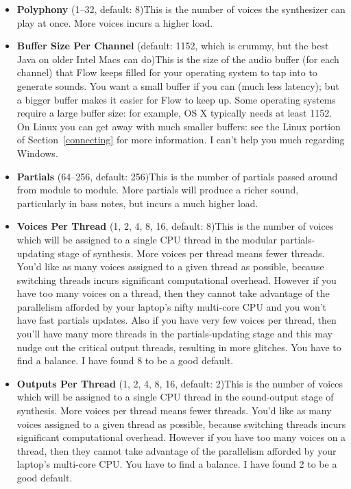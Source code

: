 \documentclass{article}
\newcommand\name{Flow}
\begin{document}
\begin{itemize}
\item {\bf Polyphony} (1--32, default: 8)\qquad This is the number of voices the synthesizer can play at once.  More voices incurs a higher load.

\item {\bf Buffer Size Per Channel} (default: 1152, which is crummy, but the best Java on older Intel Macs can do)\qquad This is the size of the audio buffer (for each channel) that {\name} keeps filled for your operating system to tap into to generate sounds.  You want a small buffer if you can (much less latency); but a bigger buffer makes it easier for Flow to keep up.  Some operating systems require a large buffer size: for example, OS X typically needs at least 1152. On Linux you can get away with much smaller buffers: see the Linux portion of Section~\ref{connecting} for more information.  I can't help you much regarding Windows.

\item {\bf Partials} (64--256, default: 256)\qquad This is the number of partials passed around from module to module.  More partials will produce a richer sound, particularly in bass notes, but incurs a much higher load.

\item {\bf Voices Per Thread} (1, 2, 4, 8, 16, default: 8)\qquad This is the number of voices which will be assigned to a single CPU thread in the modular partials-updating stage of synthesis.  More voices per thread means fewer threads.  You'd like as many voices assigned to a given thread as possible, because switching threads incurs significant computational overhead.  However if you have too many voices on a thread, then they cannot take advantage of the parallelism afforded by your laptop's nifty multi-core CPU and you won't have fast partials updates.  Also if you have very few voices per thread, then you'll have many more threads in the partials-updating stage and this may nudge out the critical output threads, resulting in more glitches.  You have to find a balance.   I have found 8 to be a good default.

\item {\bf Outputs Per Thread} (1, 2, 4, 8, 16, default: 2)\qquad This is the number of voices which will be assigned to a single CPU thread in the sound-output stage of synthesis.  More voices per thread means fewer threads.  You'd like as many voices assigned to a given thread as possible, because switching threads incurs significant computational overhead.  However if you have too many voices on a thread, then they cannot take advantage of the parallelism afforded by your laptop's multi-core CPU.  You have to find a balance.    I have found 2 to be a good default.


\end{itemize}
\end{document}
